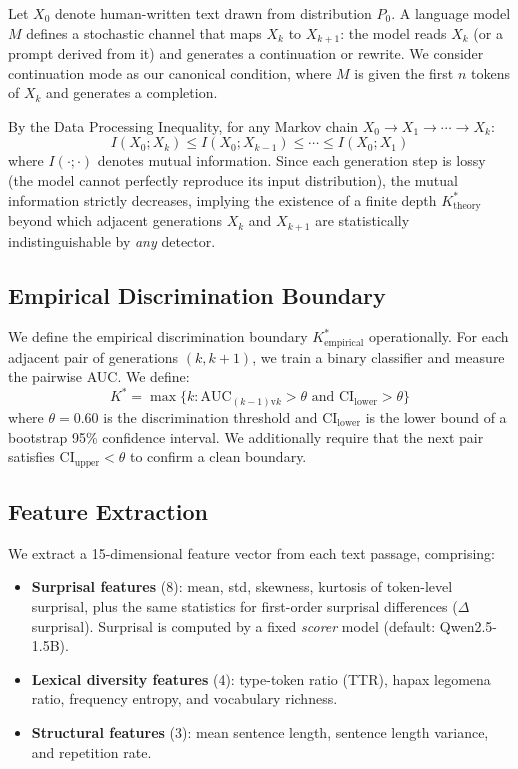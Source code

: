 \documentclass[11pt]{article}
\newcommand{\Kstar}{K^{*}}
\begin{document}
Let $X_0$ denote human-written text drawn from distribution $P_0$.
A language model $M$ defines a stochastic channel that maps $X_k$ to $X_{k+1}$: the model reads $X_k$ (or a prompt derived from it) and generates a continuation or rewrite.
We consider continuation mode as our canonical condition, where $M$ is given the first $n$ tokens of $X_k$ and generates a completion.

By the Data Processing Inequality, for any Markov chain $X_0 \to X_1 \to \cdots \to X_k$:
\begin{equation}
  I(X_0; X_k) \leq I(X_0; X_{k-1}) \leq \cdots \leq I(X_0; X_1)
  \label{eq:dpi}
\end{equation}
where $I(\cdot;\cdot)$ denotes mutual information.
Since each generation step is lossy (the model cannot perfectly reproduce its input distribution), the mutual information strictly decreases, implying the existence of a finite depth $\Kstar_{\mathrm{theory}}$ beyond which adjacent generations $X_k$ and $X_{k+1}$ are statistically indistinguishable by \emph{any} detector.

\subsection{Empirical Discrimination Boundary}
\label{sec:kstar_def}

We define the empirical discrimination boundary $\Kstar_{\mathrm{empirical}}$ operationally.
For each adjacent pair of generations $(k, k\!+\!1)$, we train a binary classifier and measure the pairwise AUC.
We define:
\begin{equation}
  \Kstar = \max\{k : \text{AUC}_{(k-1)\text{v}k} > \theta \text{ and } \mathrm{CI}_{\mathrm{lower}} > \theta\}
  \label{eq:kstar}
\end{equation}
where $\theta = 0.60$ is the discrimination threshold and $\mathrm{CI}_{\mathrm{lower}}$ is the lower bound of a bootstrap 95\% confidence interval.
We additionally require that the next pair satisfies $\mathrm{CI}_{\mathrm{upper}} < \theta$ to confirm a clean boundary.

\subsection{Feature Extraction}
\label{sec:features}

We extract a 15-dimensional feature vector from each text passage, comprising:
\begin{itemize}
  \item \textbf{Surprisal features} (8): mean, std, skewness, kurtosis of token-level surprisal, plus the same statistics for first-order surprisal differences ($\Delta$surprisal). Surprisal is computed by a fixed \emph{scorer} model (default: Qwen2.5-1.5B).
  \item \textbf{Lexical diversity features} (4): type-token ratio (TTR), hapax legomena ratio, frequency entropy, and vocabulary richness.
  \item \textbf{Structural features} (3): mean sentence length, sentence length variance, and repetition rate.
\end{itemize}
\end{document}
